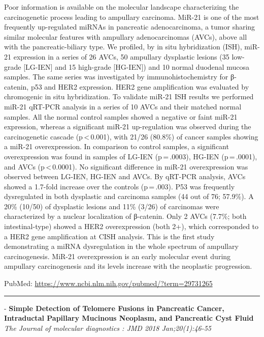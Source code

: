 \documentclass[]{article}
\begin{document}
Poor information is available on the molecular landscape characterizing
the carcinogenetic process leading to ampullary carcinoma. MiR-21 is one
of the most frequently up-regulated miRNAs in pancreatic adenocarcinoma,
a tumor sharing similar molecular features with ampullary
adenocarcinomas (AVCs), above all with the pancreatic-biliary type. We
profiled, by in situ hybridization (ISH), miR-21 expression in a series
of 26 AVCs, 50 ampullary dysplastic lesions (35 low-grade {[}LG-IEN{]}
and 15 high-grade {[}HG-IEN{]}) and 10 normal duodenal mucosa samples.
The same series was investigated by immunohistochemistry for β-catenin,
p53 and HER2 expression. HER2 gene amplification was evaluated by
chromogenic in situ hybridization. To validate miR-21 ISH results we
performed miR-21 qRT-PCR analysis in a series of 10 AVCs and their
matched normal samples. All the normal control samples showed a negative
or faint miR-21 expression, whereas a significant miR-21 up-regulation
was observed during the carcinogenetic cascade (p\,\textless{}\,0.001),
with 21/26 (80.8\%) of cancer samples showing a miR-21 overexpression.
In comparison to control samples, a significant overexpression was found
in samples of LG-IEN (p\,=\,.0003), HG-IEN (p\,=\,.0001), and AVCs
(p\,\textless{}\,0.0001). No significant difference in miR-21
overexpression was observed between LG-IEN, HG-IEN and AVCs. By qRT-PCR
analysis, AVCs showed a 1.7-fold increase over the controls
(p\,=\,.003). P53 was frequently dysregulated in both dysplastic and
carcinoma samples (44 out of 76; 57.9\%). A 20\% (10/50) of dysplastic
lesions and 11\% (3/26) of carcinomas were characterized by a nuclear
localization of β-catenin. Only 2 AVCs (7.7\%; both intestinal-type)
showed a HER2 overexpression (both 2+), which corresponded to a HER2
gene amplification at CISH analysis. This is the first study
demonstrating a miRNA dysregulation in the whole spectrum of ampullary
carcinogenesis. MiR-21 overexpression is an early molecular event during
ampullary carcinogenesis and its levels increase with the neoplastic
progression.

PubMed: \url{https://www.ncbi.nlm.nih.gov/pubmed/?term=29731265}

{}

{}

\begin{center}\rule{0.5\linewidth}{\linethickness}\end{center}

 - \textbf{Simple Detection of Telomere Fusions in Pancreatic Cancer,
Intraductal Papillary Mucinous Neoplasm, and Pancreatic Cyst Fluid}
\emph{The Journal of molecular diagnostics : JMD 2018 Jan;20(1):46-55}
\end{document}
